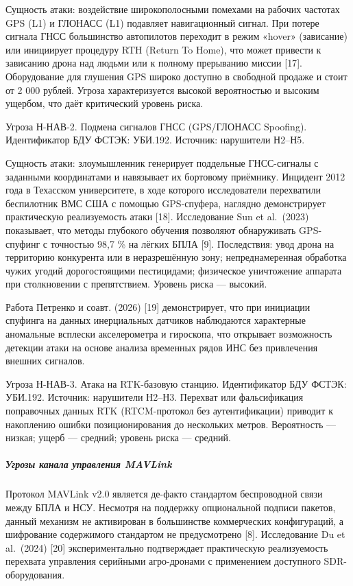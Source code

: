 \documentclass[14pt,a4paper]{extarticle}
\begin{document}
Сущность атаки: воздействие широкополосными помехами на рабочих частотах GPS (L1) и ГЛОНАСС (L1) подавляет навигационный сигнал. При потере сигнала ГНСС большинство автопилотов переходит в режим «hover» (зависание) или инициирует процедуру RTH (Return To Home), что может привести к зависанию дрона над людьми или к полному прерыванию миссии {[}17{]}. Оборудование для глушения GPS широко доступно в свободной продаже и стоит от 2 000 рублей. Угроза характеризуется высокой вероятностью и высоким ущербом, что даёт критический уровень риска.

Угроза Н-НАВ-2. Подмена сигналов ГНСС (GPS/ГЛОНАСС Spoofing). Идентификатор БДУ ФСТЭК: УБИ.192. Источник: нарушители Н2--Н5.

Сущность атаки: злоумышленник генерирует поддельные ГНСС-сигналы с заданными координатами и навязывает их бортовому приёмнику. Инцидент 2012 года в Техасском университете, в ходе которого исследователи перехватили беспилотник ВМС США с помощью GPS-спуфера, наглядно демонстрирует практическую реализуемость атаки {[}18{]}. Исследование Sun et al.~(2023) показывает, что методы глубокого обучения позволяют обнаруживать GPS-спуфинг с точностью 98,7 \% на лёгких БПЛА {[}9{]}. Последствия: увод дрона на территорию конкурента или в неразрешённую зону; непреднамеренная обработка чужих угодий дорогостоящими пестицидами; физическое уничтожение аппарата при столкновении с препятствием. Уровень риска --- высокий.

Работа Петренко и соавт. (2026) {[}19{]} демонстрирует, что при инициации спуфинга на данных инерциальных датчиков наблюдаются характерные аномальные всплески акселерометра и гироскопа, что открывает возможность детекции атаки на основе анализа временных рядов ИНС без привлечения внешних сигналов.

Угроза Н-НАВ-3. Атака на RTK-базовую станцию. Идентификатор БДУ ФСТЭК: УБИ.192. Источник: нарушители Н2--Н3. Перехват или фальсификация поправочных данных RTK (RTCM-протокол без аутентификации) приводит к накоплению ошибки позиционирования до нескольких метров. Вероятность --- низкая; ущерб --- средний; уровень риска --- средний.

\hypertarget{ux443ux433ux440ux43eux437ux44b-ux43aux430ux43dux430ux43bux430-ux443ux43fux440ux430ux432ux43bux435ux43dux438ux44f-mavlink}{%
\subparagraph{Угрозы канала управления MAVLink}\label{ux443ux433ux440ux43eux437ux44b-ux43aux430ux43dux430ux43bux430-ux443ux43fux440ux430ux432ux43bux435ux43dux438ux44f-mavlink}}

Протокол MAVLink v2.0 является де-факто стандартом беспроводной связи между БПЛА и НСУ. Несмотря на поддержку опциональной подписи пакетов, данный механизм не активирован в большинстве коммерческих конфигураций, а шифрование содержимого стандартом не предусмотрено {[}8{]}. Исследование Du et al.~(2024) {[}20{]} экспериментально подтверждает практическую реализуемость перехвата управления серийными агро-дронами с применением доступного SDR-оборудования.
\end{document}
